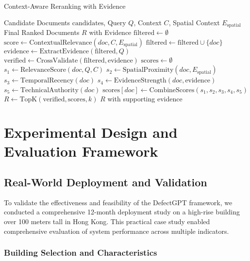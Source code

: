 \begin{algorithm}[htbp]
\caption{Context-Aware Reranking with Evidence}
\label{alg:context-rerank}
\begin{algorithmic}[1]
\REQUIRE Candidate Documents $\text{candidates}$, Query $Q$, Context $C$, Spatial Context $E_{\text{spatial}}$
\ENSURE Final Ranked Documents $R$ with Evidence
\STATE $\text{filtered} \gets \emptyset$
    \STATE $\text{score} \gets \text{ContextualRelevance}(doc, C, E_{\text{spatial}})$
        \STATE $\text{filtered} \gets \text{filtered} \cup \{doc\}$
    \ENDIF
\ENDFOR
\STATE $\text{evidence} \gets \text{ExtractEvidence}(\text{filtered}, Q)$
\STATE $\text{verified} \gets \text{CrossValidate}(\text{filtered}, \text{evidence})$
\STATE $\text{scores} \gets \emptyset$
    \STATE $s_1 \gets \text{RelevanceScore}(doc, Q, C)$
    \STATE $s_2 \gets \text{SpatialProximity}(doc, E_{\text{spatial}})$
    \STATE $s_3 \gets \text{TemporalRecency}(doc)$
    \STATE $s_4 \gets \text{EvidenceStrength}(doc, \text{evidence})$
    \STATE $s_5 \gets \text{TechnicalAuthority}(doc)$
    \STATE $\text{scores}[doc] \gets \text{CombineScores}(s_1, s_2, s_3, s_4, s_5)$
\ENDFOR
\STATE $R \gets \text{TopK}(\text{verified}, \text{scores}, k)$
\RETURN $R$ with supporting evidence
\end{algorithmic}
\end{algorithm}

\section{Experimental Design and Evaluation Framework}

\subsection{Real-World Deployment and Validation}

To validate the effectiveness and feasibility of the DefectGPT framework, we conducted a comprehensive 12-month deployment study on a high-rise building over 100 meters tall in Hong Kong. This practical case study enabled comprehensive evaluation of system performance across multiple indicators.

\subsubsection{Building Selection and Characteristics}

